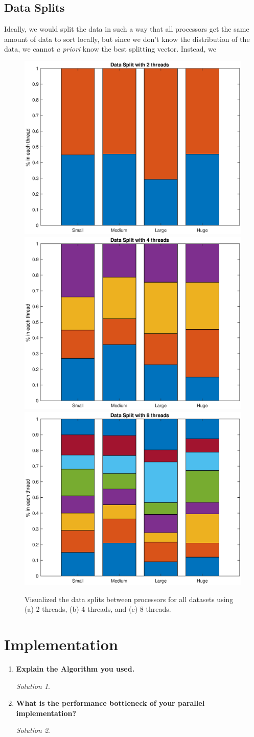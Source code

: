 \documentclass[a4paper,12pt]{article}
\theoremstyle{definition}
\theoremstyle{remark}
\newtheorem*{solution}{Solution}
\begin{document}
	
	\subsection{Data Splits}
	Ideally, we would split the data in such a way that all processors get the same amount of data to sort locally, but since we don't know the distribution of the data, we cannot \textit{a priori} know the best splitting vector. Instead, we 
	\begin{figure}[h]
	\centering
	\includegraphics[width=0.45\linewidth]{dataSplits2}
	\includegraphics[width=0.45\linewidth]{dataSplits4}
	\includegraphics[width=0.45\linewidth]{dataSplits8}
	\label{fig:SpectralDeriv2}
	\caption{Visualized the data splits between processors for all datasets using (a) 2 threads, (b) 4 threads, and (c) 8 threads.}
	\end{figure}
	
	\section{Implementation}
	\begin{enumerate}
		\item \textbf{ Explain the Algorithm you used.}
		\begin{solution}
		
		\end{solution}
		\item \textbf{What is the performance bottleneck of your parallel implementation?}
		\begin{solution}
			
		\end{solution}
	\end{enumerate}
	
\end{document}
